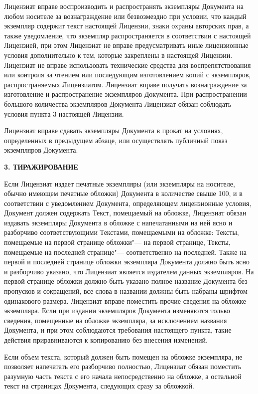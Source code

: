 Лицензиат вправе воспроизводить и распространять экземпляры Документа на
любом носителе за вознаграждение или безвозмездно при условии, что
каждый экземпляр содержит текст настоящей Лицензии, знаки охраны
авторских прав, а также уведомление, что экземпляр распространяется в
соответствии с настоящей Лицензией, при этом Лицензиат не вправе
предусматривать иные лицензионные условия дополнительно к тем, которые
закреплены в настоящей Лицензии. Лицензиат не вправе использовать
технические средства для воспрепятствования или контроля за чтением или
последующим изготовлением копий с экземпляров, распространяемых
Лицензиатом. Лицензиат вправе получать вознаграждение за изготовление и
распространение экземпляров Документа. При распространении большого
количества экземпляров Документа Лицензиат обязан соблюдать условия
пункта 3 настоящей Лицензии.

Лицензиат вправе сдавать экземпляры Документа в прокат на условиях,
определенных в предыдущем абзаце, или осуществлять публичный показ
экземпляров Документа.


\begin{center}
{\Large\bf 3. ТИРАЖИРОВАНИЕ\par}
\end{center}


Если Лицензиат издает печатные экземпляры (или экземпляры на носителе,
обычно имеющем печатные обложки) Документа в количестве свыше 100, и в
соответствии с уведомлением Документа, определяющем лицензионные условия,
Документ должен содержать Текст, помещаемый на обложке, Лицензиат обязан
издавать экземпляры Документа в обложке с напечатанными на ней ясно и
разборчиво соответствующими Текстами, помещаемыми на обложке: Тексты,
помещаемые на первой странице обложки"--- на первой странице, Тексты,
помещаемые на последней странице"--- соответственно на последней. Также
на первой и последней странице обложки экземпляра Документа должно быть
ясно и разборчиво указано, что Лицензиат является издателем данных
экземпляров. На первой странице обложки должно быть указано полное
название Документа без пропусков и сокращений, все слова в названии
должны быть набраны шрифтом одинакового размера. Лицензиат вправе
поместить прочие сведения на обложке экземпляра. Если при издании
экземпляров Документа изменяются только сведения, помещенные на обложке
экземпляра, за исключением названия Документа, и при этом соблюдаются
требования настоящего пункта, такие действия приравниваются к
копированию без внесения изменений.

Если объем текста, который должен быть помещен на обложке экземпляра, не
позволяет напечатать его разборчиво полностью, Лицензиат обязан
поместить разумную часть текста с его начала непосредственно на обложке,
а остальной текст на страницах Документа, следующих сразу за обложкой.

